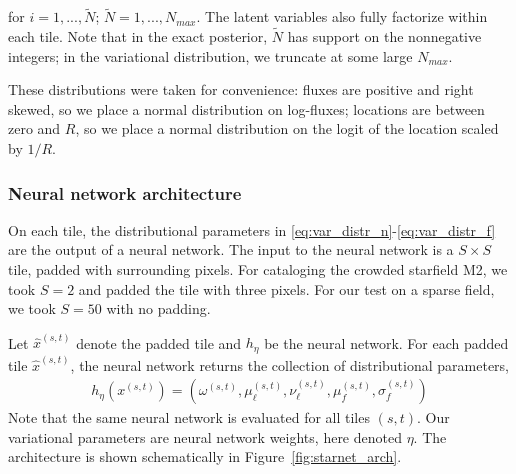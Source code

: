 for $i = 1, ..., \tilde N$; $\tilde N = 1, ..., N_{max}$. The latent variables also fully factorize within each tile. Note that in the exact posterior, $\tilde N$ has support on the nonnegative integers; in the variational distribution, we truncate at some large $N_{max}$. 


These distributions were taken for convenience: fluxes are positive and right skewed, so we place a normal distribution on log-fluxes; locations are between zero and $R$, so 
we place a normal distribution on the logit of the location scaled by $1 / R$. 

\subsubsection{Neural network architecture}
\label{sec:nn_archetecture}
On each tile, the distributional parameters 
in \eqref{eq:var_distr_n}-\eqref{eq:var_distr_f} are the output of a neural network.
The input to the neural network is a $S \times S$ tile, padded with surrounding pixels.
For cataloging the crowded starfield M2,
we took $S = 2$ and padded the tile with three pixels. 
For our test on a sparse field, we took $S = 50$ with no padding. 

Let $\hat x^{(s,t)}$ denote the padded tile and $h_\eta$ be the neural network. For each padded tile $\hat x^{(s,t)}$, 
the neural network returns the collection of distributional parameters, 
\begin{align}
    h_\eta(x^{(s,t)}) = (\omega^{(s,t)}, \mu_\ell^{(s,t)}, \nu_{\ell}^{(s,t)}, \mu_f^{(s,t)}, \sigma^{(s,t)}_f)
    \label{eq:nn_output}
\end{align}
Note that the same neural network is evaluated for all tiles $(s,t)$. Our variational parameters are neural network weights, here denoted $\eta$. 
The architecture is shown schematically in Figure~\ref{fig:starnet_arch}. 

